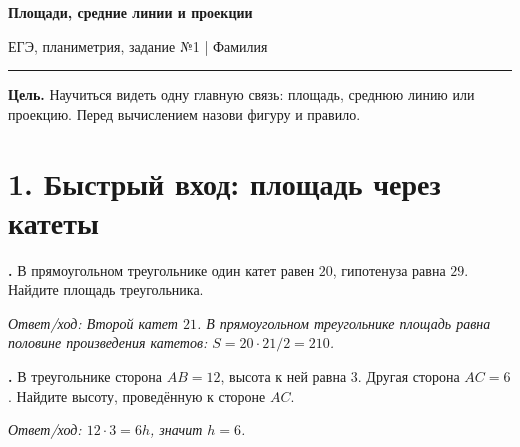 

\pagestyle{fancy}
\fancyhf{}
\cfoot{\thepage}
\setlength{\parindent}{0pt}

\newcommand{\ex}{\stepcounter{exercise}\textbf{\theexercise.} }
\newcommand{\answerline}[1]{\rule{#1}{0.4pt}}
\newcommand{\teacheranswer}[1]{\ifteacher\par\smallskip\textit{Ответ/ход: #1}\par\fi}
\newcommand{\rulecard}[2]{\noindent\fbox{\begin{minipage}{.94\linewidth}\textbf{#1} \quad #2\end{minipage}}\par\smallskip}
\newcommand{\picturedtask}[3]{%
\item \begin{minipage}[t]{.66\linewidth}#1\teacheranswer{#3}\end{minipage}\hfill
\begin{minipage}[t]{.29\linewidth}\centering #2\end{minipage}\par\medskip}



\begin{center}
{\Large\textbf{Площади, средние линии и проекции}}\\[2mm]
{\small ЕГЭ, планиметрия, задание №1 \quad | \quad Фамилия\ \answerline{6cm}}
\end{center}

\ifteacher
\begin{center}\end{center}
\fi

\textbf{Цель.} Научиться видеть одну главную связь: площадь, среднюю линию или
проекцию. Перед вычислением назови фигуру и правило.

\section*{1. Быстрый вход: площадь через катеты}

\begin{minipage}[t]{.53\linewidth}
\ex В прямоугольном треугольнике один катет равен \(20\), гипотенуза равна \(29\).
Найдите площадь треугольника.
\teacheranswer{Второй катет \(21\). В прямоугольном треугольнике площадь равна
половине произведения катетов: \(S=20\cdot21/2=210\).}

\ex В треугольнике сторона \(AB=12\), высота к ней равна \(3\). Другая сторона
\(AC=6\). Найдите высоту, проведённую к стороне \(AC\).
\teacheranswer{\(12\cdot3=6h\), значит \(h=6\).}
\end{minipage}\hfill
\begin{minipage}[t]{.4\linewidth}\centering
\figRightTriangle
\end{minipage}

